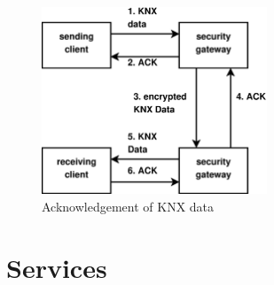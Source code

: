\begin{figure}
  \centering
    \includegraphics[width=0.6\textwidth]{figures/dataAck.eps}
 \caption{Acknowledgement of KNX data}
 \label{fig:dataAck}
\end{figure}

\section{Services}

